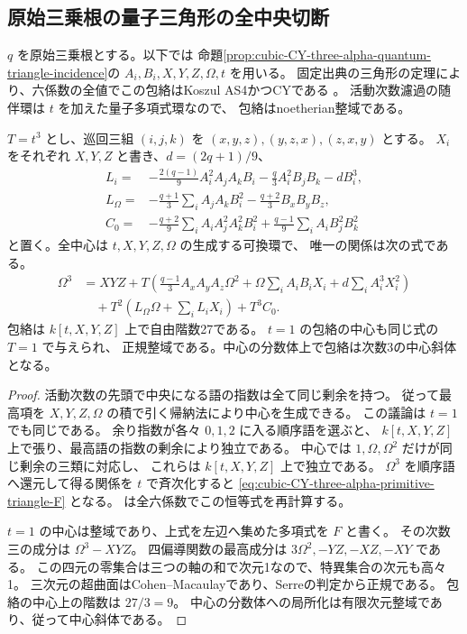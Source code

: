 \subsection{原始三乗根の量子三角形の全中央切断}
\label{subsec:cubic-CY-three-alpha-primitive-triangle}

$q$ を原始三乗根とする。以下では
命題\ref{prop:cubic-CY-three-alpha-quantum-triangle-incidence}の
$A_i,B_i,X,Y,Z,\Omega,t$ を用いる。
固定出典の三角形の定理により、六係数の全値でこの包絡はKoszul AS4かつCYである
\cite{AS4CYpinned}。
活動次数濾過の随伴環は $t$ を加えた量子多項式環なので、
包絡はnoetherian整域である。

\begin{proposition}\label{prop:cubic-CY-three-alpha-primitive-triangle-centre}
$T=t^3$ とし、巡回三組 $(i,j,k)$ を $(x,y,z),(y,z,x),(z,x,y)$ とする。
$X_i$ をそれぞれ $X,Y,Z$ と書き、$d=(2q+1)/9$、
\[
\begin{aligned}
 L_i={}&-\frac{2(q-1)}9A_i^2A_jA_k B_i
         -\frac q3 A_i^2B_jB_k-dB_i^3,\\
 L_\Omega={}&-\frac{q+1}3\sum_i A_jA_kB_i^2-\frac{q+2}3B_xB_yB_z,\\
 C_0={}&-\frac{q+2}9\sum_i A_iA_j^2A_k^2B_i^2
         +\frac{q-1}9\sum_i A_iB_j^2B_k^2
\end{aligned}
\]
と置く。全中心は $t,X,Y,Z,\Omega$ の生成する可換環で、
唯一の関係は次の式である。
\begin{equation}\label{eq:cubic-CY-three-alpha-primitive-triangle-F}
\begin{aligned}
 \Omega^3&=XYZ+
 T\left(\frac{q-1}3 A_xA_yA_z\Omega^2+
          \Omega\sum_i A_iB_iX_i+d\sum_i A_i^3X_i^2\right)\\
 &\quad+T^2\left(L_\Omega\Omega+\sum_i L_iX_i\right)+T^3 C_0 .
\end{aligned}
\end{equation}
包絡は $k[t,X,Y,Z]$ 上で自由階数27である。
$t=1$ の包絡の中心も同じ式の $T=1$ で与えられ、
正規整域である。中心の分数体上で包絡は次数3の中心斜体となる。
\end{proposition}
\begin{proof}
活動次数の先頭で中央になる語の指数は全て同じ剰余を持つ。
従って最高項を $X,Y,Z,\Omega$ の積で引く帰納法により中心を生成できる。
この議論は $t=1$ でも同じである。
余り指数が各々 $0,1,2$ に入る順序語を選ぶと、
$k[t,X,Y,Z]$ 上で張り、最高語の指数の剰余により独立である。
中心では $1,\Omega,\Omega^2$ だけが同じ剰余の三類に対応し、
これらは $k[t,X,Y,Z]$ 上で独立である。
$\Omega^3$ を順序語へ還元して得る関係を $t$ で斉次化すると
\eqref{eq:cubic-CY-three-alpha-primitive-triangle-F} となる。
は全六係数でこの恒等式を再計算する。

$t=1$ の中心は整域であり、上式を左辺へ集めた多項式を $F$ と書く。
その次数三の成分は $\Omega^3-XYZ$。
四偏導関数の最高成分は $3\Omega^2,-YZ,-XZ,-XY$ である。
この四元の零集合は三つの軸の和で次元1なので、特異集合の次元も高々1。
三次元の超曲面はCohen--Macaulayであり、Serreの判定から正規である。
包絡の中心上の階数は $27/3=9$。
中心の分数体への局所化は有限次元整域であり、従って中心斜体である。
\end{proof}

